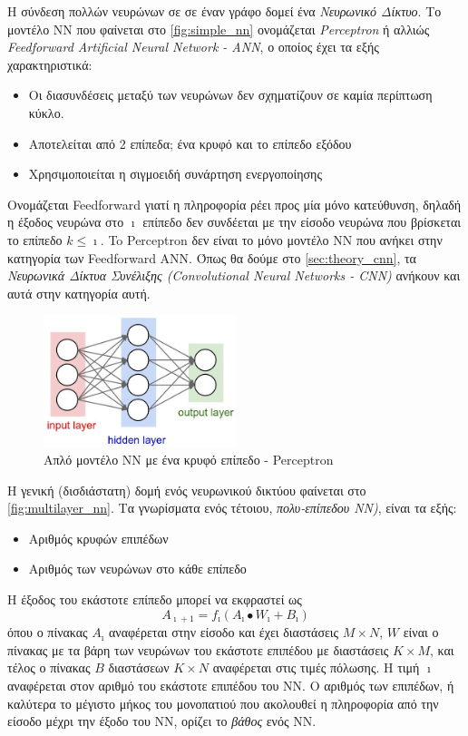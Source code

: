 Η σύνδεση πολλών νευρώνων σε σε έναν γράφο δομεί ένα \emph{Νευρωνικό Δίκτυο}.
Το μοντέλο ΝΝ που φαίνεται στο \autoref{fig:simple_nn}
ονομάζεται \emph{Perceptron} ή αλλιώς
\emph{Feedforward Artificial Neural Network - ANN}, ο οποίος έχει τα εξής χαρακτηριστικά:
\begin{itemize}
  \item{Οι διασυνδέσεις μεταξύ των νευρώνων δεν σχηματίζουν σε καμία περίπτωση κύκλο.}
  \item{Αποτελείται από 2 επίπεδα; ένα κρυφό και το επίπεδο εξόδου}
  \item{Χρησιμοποιείται η σιγμοειδή συνάρτηση ενεργοποίησης}
\end{itemize}
Ονομάζεται Feedforward γιατί η πληροφορία ρέει προς μία μόνο κατεύθυνση, δηλαδή
η έξοδος νευρώνα στο $\imath$ επίπεδο δεν συνδέεται με την είσοδο νευρώνα
που βρίσκεται το επίπεδο $k \leq \imath$.
To Perceptron δεν είναι το μόνο
μοντέλο ΝΝ που ανήκει στην κατηγορία των Feedforward ANN. Όπως θα δούμε στο
\autoref{sec:theory_cnn}, τα \emph{Νευρωνικά Δίκτυα Συνέλιξης
(Convolutional Neural Networks - CNN)} ανήκουν και αυτά στην κατηγορία αυτή.

\begin{figure}[!ht]
  \centering
  \includegraphics[width=0.5\textwidth]{./images/chapter3/simple_nn.jpg}
  \caption[Απλό μοντέλο NN με ένα κρυφό επίπεδο - Perceptron]{Απλό μοντέλο NN με ένα κρυφό επίπεδο - Perceptron}
  \label{fig:simple_nn}
\end{figure}

Η γενική (δισδιάστατη) δομή ενός νευρωνικού δικτύου φαίνεται στο \autoref{fig:multilayer_nn}.
Τα γνωρίσματα ενός τέτοιου, \emph{πολυ-επίπεδου ΝΝ)}, είναι τα εξής:
\begin{itemize}
  \item{Αριθμός κρυφών επιπέδων}
  \item{Αριθμός των νευρώνων στο κάθε επίπεδο}
\end{itemize}
Η έξοδος του εκάστοτε επίπεδο μπορεί να εκφραστεί ως
\[
  A_{\imath+1} = f_{\imath}(A_{\imath} \bullet W_{\imath} + B_{\imath})
\]
όπου ο πίνακας $A_{\imath}$ αναφέρεται στην είσοδο και έχει διαστάσεις $M \times N$,
$W$ είναι ο πίνακας με τα βάρη των νευρώνων του εκάστοτε επιπέδου με διαστάσεις
$K \times M$, και τέλος ο πίνακας $B$ διαστάσεων $K \times N$ αναφέρεται στις
τιμές πόλωσης.
Η τιμή $\imath$ αναφέρεται στον αριθμό του εκάστοτε επιπέδου του ΝΝ.
Ο αριθμός των επιπέδων, ή καλύτερα το μέγιστο μήκος του μονοπατιού που ακολουθεί
η πληροφορία από την είσοδο μέχρι την έξοδο του ΝΝ, ορίζει το \emph{βάθος} ενός ΝΝ.


